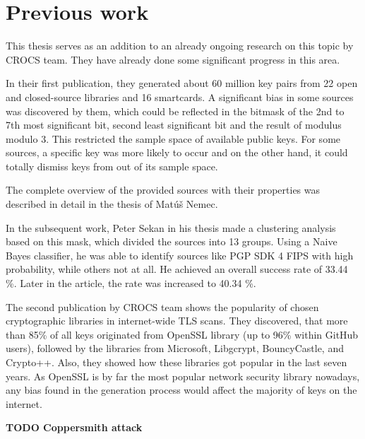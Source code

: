 \chapter{Previous work}
\label{chapter-prev-work}

This thesis serves as an addition to an already ongoing research on this topic by CROCS team. They have already done some significant progress in this area. 

In their first publication\cite{svenda_1}, they generated about 60 million key pairs from 22 open and closed-source libraries and 16 smartcards. A significant bias in some sources was discovered by them, which could be reflected in the bitmask of the 2nd to 7th most significant bit, second least significant bit and the result of modulus modulo 3. This restricted the sample space of available public keys. For some sources, a specific key was more likely to occur and on the other hand, it could totally dismiss keys from out of its sample space.

The complete overview of the provided sources with their properties was described in detail in the thesis of Mat\'{u}š Nemec\cite{thesis_matus_nemec}.

In the subsequent work, Peter Sekan in his thesis\cite{thesis_sekan} made a clustering analysis based on this mask, which divided the sources into 13 groups. Using a Naive Bayes classifier, he was able to identify sources like PGP SDK 4 FIPS with high probability, while others not at all. He achieved an overall success rate of 33.44 \%. Later in the article, the rate was increased to 40.34 \%.

The second publication by CROCS team\cite{svenda_3} shows the popularity of chosen cryptographic libraries in internet-wide TLS scans. They discovered, that more than 85\% of all keys originated from OpenSSL library (up to 96\% within GitHub users), followed by the libraries from Microsoft, Libgcrypt, BouncyCastle, and Crypto++. Also, they showed how these libraries got popular in the last seven years. As OpenSSL is by far the most popular network security library nowadays, any bias found in the generation process would affect the majority of keys on the internet.

\textbf{TODO Coppersmith attack} \cite{svenda_2}
